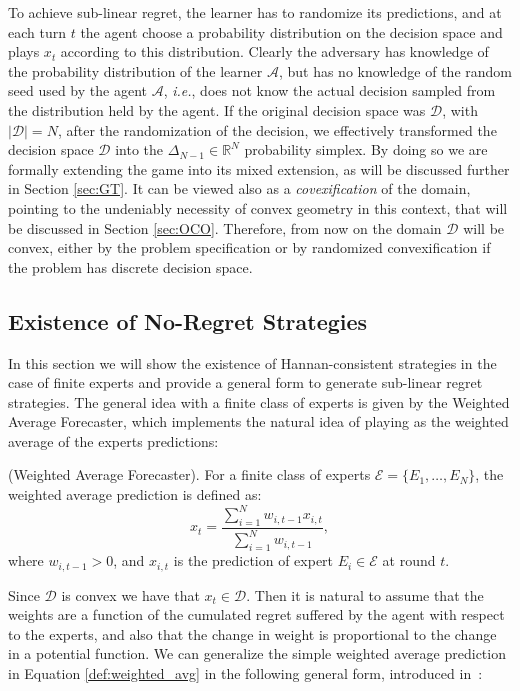 To achieve sub-linear regret, the learner has to randomize its predictions, and at each turn $t$ the agent choose a probability distribution on the decision space and plays $x_t$ according to this distribution. Clearly the adversary has knowledge of the probability distribution of the learner $\mathcal A$, but has no knowledge of the random seed used by the agent $\mathcal A$, \emph{i.e.}, does not know the actual decision sampled from the distribution held by the agent. If the original decision space was $\mathcal D$, with $|\mathcal D|=N$, after the randomization of the decision, we effectively transformed the decision space $\mathcal D$ into the $\Delta_{N-1}\in\mathbb R^{N}$ probability simplex. By doing so we are formally extending the game into its mixed extension, as will be discussed further in Section \ref{sec:GT}. It can be viewed also as a \emph{covexification} of the domain, pointing to the undeniably necessity of convex geometry in this context, that will be discussed in Section \ref{sec:OCO}. Therefore, from now on the domain $\mathcal D$ will be convex, either by the problem specification or by randomized convexification if the problem has discrete decision space.

\subsection{Existence of No-Regret Strategies}\label{sec:existence_of_no_regret}
In this section we will show the existence of Hannan-consistent strategies in the case of finite experts and provide a general form to generate sub-linear regret strategies. 
The general idea with a finite class of experts is given by the Weighted Average Forecaster, which implements the natural idea of playing as the weighted average of the experts predictions:

\begin{definition}(Weighted Average Forecaster).\label{def:weighted_avg}
For a finite class of experts $\mathcal E=\{E_1,\ldots,E_N\}$, the weighted average prediction is defined as:
\begin{equation}
	x_t = \frac{\sum\limits_{i=1}^{N}w_{i,t-1}x_{i,t}}{\sum\limits_{i=1}^{N}w_{i,t-1}},
\end{equation}
where $w_{i,t-1}>0$, and $x_{i,t}$ is the prediction of expert $E_i\in\mathcal E$ at round $t$. 
\end{definition}

Since $\mathcal D$ is convex we have that $x_t\in\mathcal D$.
Then it is natural to assume that the weights are a function of the cumulated regret suffered by the agent with respect to the experts, and also that the change in weight is proportional to the change in a potential function.
We can generalize the simple weighted average prediction in Equation \eqref{def:weighted_avg} in the following general form, introduced in~\cite{cesa2003potential}:

